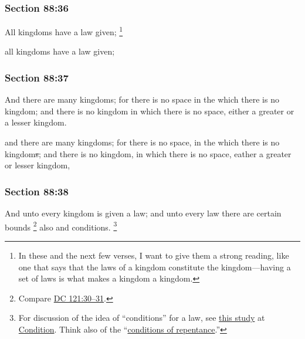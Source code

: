 	\subsubsection{Section 88:36} %
		\label{DC88-36}

		All kingdoms have a law given;%
			\footnote{%
				In these and the next few verses, I want to give them a strong reading, like one that says that the laws of a kingdom constitute the kingdom---having a set of laws is what makes a kingdom a kingdom.
				} 

		\begin{framed}
		\scriptsize
			\begin{compactdesc}
				\item[JSP] all kingdoms have a law given;
			\end{compactdesc}
		\end{framed}

	\subsubsection{Section 88:37} %
		\label{DC88-37}

		And there are many kingdoms; for there is no space in the which there is no kingdom; and there is no kingdom in which there is no space, either a greater or a lesser kingdom.

		\begin{framed}
		\scriptsize
			\begin{compactdesc}
				\item[JSP] and there are many kingdoms; for there is no space, in the which there is no kingdom\sout{s}; and there is no kingdom, in which there is no space, eather a greater or lesser kingdom,
			\end{compactdesc}
		\end{framed}

	\subsubsection{Section 88:38} %
		\label{DC88-38}

		And unto every kingdom is given a law; and unto every law there are certain bounds%
			\footnote{%
				Compare \hyperref[DC121-30]{DC 121:30--31}.
				}
		also and conditions.%
			\footnote{%
				\label{DC88-38-NOTE-conditions}%
				For discussion of the idea of ``conditions'' for a law, see \hyperref[CONDITION-laws]{this study} at \hyperref[CONDITION]{Condition}. Think also of the ``\hyperref[CONDITION-PHRASES]{conditions of repentance}.''
				}

